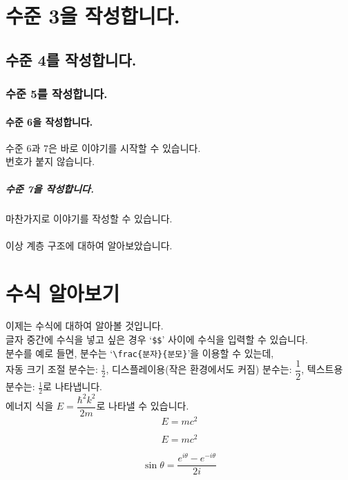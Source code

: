 \documentclass{article} %
\begin{document}
  	\section{수준 3을 작성합니다.}
    	\subsection{수준 4를 작성합니다.}
      	\subsubsection{수준 5를 작성합니다.}
        	\paragraph{수준 6을 작성합니다.}
          수준 6과 7은 바로 이야기를 시작할 수 있습니다.\\번호가 붙지 않습니다.
          	\subparagraph{수준 7을 작성합니다.} 마찬가지로 이야기를 작성할 수 있습니다. \\\\

이상 계층 구조에 대하여 알아보았습니다.
\vspace{2em}

\section{수식 알아보기}

이제는 수식에 대하여 알아볼 것입니다.\\

글자 중간에 수식을 넣고 싶은 경우 `\verb|$$|' 사이에 수식을 입력할 수 있습니다.\\
분수를 예로 들면, 분수는 `\verb|\frac{분자}{분모}|'을 이용할 수 있는데,\\
자동 크기 조절 분수는: $\frac{1}{2}$, 
디스플레이용(작은 환경에서도 커짐) 분수는: $\dfrac{1}{2}$, 
텍스트용 분수는: $\tfrac{1}{2}$로 나타냅니다.\\
에너지 식을 $E=\dfrac{{\hbar^{2} k^{2}}}{2m}$로 나타낼 수 있습니다.\\

\begin{equation} %
    E = mc^2
\end{equation}

\begin{equation*} %
    E = mc^2
\end{equation*}

\begin{equation}
    \sin \theta = \frac{e^{i \theta} - e^{-i \theta}}{2i} %
\end{equation}
\end{document}
